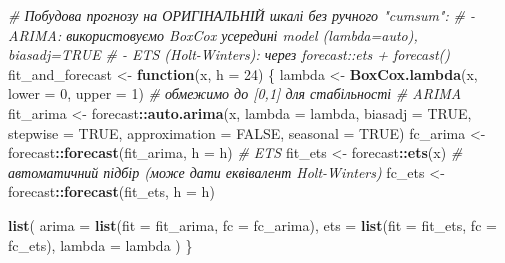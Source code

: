 \documentclass[
]{article}
\newenvironment{Shaded}{\begin{snugshade}}{\end{snugshade}}
\newcommand{\AttributeTok}[1]{\textcolor[rgb]{0.13,0.29,0.53}{#1}}
\newcommand{\CommentTok}[1]{\textcolor[rgb]{0.56,0.35,0.01}{\textit{#1}}}
\newcommand{\ConstantTok}[1]{\textcolor[rgb]{0.56,0.35,0.01}{#1}}
\newcommand{\ControlFlowTok}[1]{\textcolor[rgb]{0.13,0.29,0.53}{\textbf{#1}}}
\newcommand{\DecValTok}[1]{\textcolor[rgb]{0.00,0.00,0.81}{#1}}
\newcommand{\FunctionTok}[1]{\textcolor[rgb]{0.13,0.29,0.53}{\textbf{#1}}}
\newcommand{\NormalTok}[1]{#1}
\newcommand{\OtherTok}[1]{\textcolor[rgb]{0.56,0.35,0.01}{#1}}
\newcommand{\SpecialCharTok}[1]{\textcolor[rgb]{0.81,0.36,0.00}{\textbf{#1}}}
\begin{document}
\begin{Shaded}
\begin{Highlighting}[]
\CommentTok{\# Побудова прогнозу на ОРИГІНАЛЬНІЙ шкалі без ручного "cumsum":}
\CommentTok{\# {-} ARIMA: використовуємо BoxCox усередині model (lambda=auto), biasadj=TRUE}
\CommentTok{\# {-} ETS (Holt{-}Winters): через forecast::ets + forecast()}
\NormalTok{fit\_and\_forecast }\OtherTok{\textless{}{-}} \ControlFlowTok{function}\NormalTok{(x, }\AttributeTok{h =} \DecValTok{24}\NormalTok{) \{}
\NormalTok{  lambda }\OtherTok{\textless{}{-}} \FunctionTok{BoxCox.lambda}\NormalTok{(x, }\AttributeTok{lower =} \DecValTok{0}\NormalTok{, }\AttributeTok{upper =} \DecValTok{1}\NormalTok{) }\CommentTok{\# обмежимо до [0,1] для стабільності}
  \CommentTok{\# ARIMA}
\NormalTok{  fit\_arima }\OtherTok{\textless{}{-}}\NormalTok{ forecast}\SpecialCharTok{::}\FunctionTok{auto.arima}\NormalTok{(x, }\AttributeTok{lambda =}\NormalTok{ lambda, }\AttributeTok{biasadj =} \ConstantTok{TRUE}\NormalTok{, }\AttributeTok{stepwise =} \ConstantTok{TRUE}\NormalTok{, }\AttributeTok{approximation =} \ConstantTok{FALSE}\NormalTok{, }\AttributeTok{seasonal =} \ConstantTok{TRUE}\NormalTok{)}
\NormalTok{  fc\_arima }\OtherTok{\textless{}{-}}\NormalTok{ forecast}\SpecialCharTok{::}\FunctionTok{forecast}\NormalTok{(fit\_arima, }\AttributeTok{h =}\NormalTok{ h)}
  \CommentTok{\# ETS}
\NormalTok{  fit\_ets }\OtherTok{\textless{}{-}}\NormalTok{ forecast}\SpecialCharTok{::}\FunctionTok{ets}\NormalTok{(x)  }\CommentTok{\# автоматичний підбір (може дати еквівалент Holt{-}Winters)}
\NormalTok{  fc\_ets }\OtherTok{\textless{}{-}}\NormalTok{ forecast}\SpecialCharTok{::}\FunctionTok{forecast}\NormalTok{(fit\_ets, }\AttributeTok{h =}\NormalTok{ h)}
  
  \FunctionTok{list}\NormalTok{(}
    \AttributeTok{arima =} \FunctionTok{list}\NormalTok{(}\AttributeTok{fit =}\NormalTok{ fit\_arima, }\AttributeTok{fc =}\NormalTok{ fc\_arima),}
    \AttributeTok{ets   =} \FunctionTok{list}\NormalTok{(}\AttributeTok{fit =}\NormalTok{ fit\_ets,   }\AttributeTok{fc =}\NormalTok{ fc\_ets),}
    \AttributeTok{lambda =}\NormalTok{ lambda}
\NormalTok{  )}
\NormalTok{\}}


\end{Highlighting}
\end{Shaded}
\end{document}
